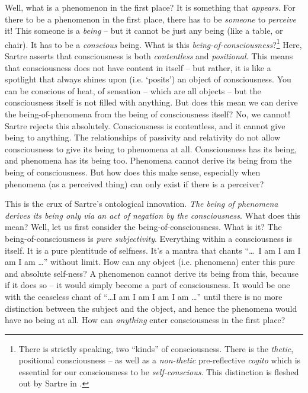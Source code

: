 Well, what is a phenomenon in the first place? It is something that \emph{appears}. For there to be a phenomenon in the first place, there has to be \emph{someone} to \emph{perceive} it! This someone is a \emph{being} -- but it cannot be just any being (like a table, or chair). It has to be a \emph{conscious} being. What is this \emph{being-of-consciousness}?\footnote{There is strictly speaking, two \enquote{kinds} of consciousness. There is the \emph{thetic}, positional consciousness -- as well as a \emph{non-thetic} pre-reflective \emph{cogito} which is essential for our consciousness to be \emph{self-conscious}. This distinction is fleshed out by Sartre in \autocite[11]{sartre}.} Here, Sartre asserts that consciousness is both \emph{contentless} and \emph{positional}. This means that consciousness does not have content in itself -- but rather, it is like a spotlight that always shines upon (i.e. \enquote*{posits}) an object of consciousness. You can be conscious of heat, of sensation -- which are all objects -- but the consciousness itself is not filled with anything. But does this mean we can derive the being-of-phenomena from the being of consciousness itself? No, we cannot! Sartre rejects this absolutely. Consciousness is contentless, and it cannot give being to anything. The relationships of passivity and relativity do not allow consciousness to give its being to phenomena at all. Consciousness has its being, and phenomena has its being too. Phenomena cannot derive its being from the being of consciousness. But how does this make sense, especially when phenomena (as a perceived thing) can only exist if there is a perceiver? 

This is the crux of Sartre's ontological innovation. \emph{The being of phenomena derives its being only via an act of negation by the consciousness}. What does this mean? Well, let us first consider the being-of-consciousness. What is it? The being-of-consciousness is \emph{pure subjectivity}. Everything within a consciousness is itself. It is a pure plentitude of selfness. It's a mantra that chants \enquote{\ldots\ I am I am I am I am \ldots} without limit. How can any object (i.e. phenomena) enter this pure and absolute self-ness? A phenomenon cannot derive its being from this, because if it does so -- it would simply become a part of consciousness. It would be one with the ceaseless chant of \enquote{\ldots I am I am I am I am \ldots} until there is no more distinction between the subject and the object, and hence the phenomena would have no being at all. How can \emph{anything} enter consciousness in the first place?

